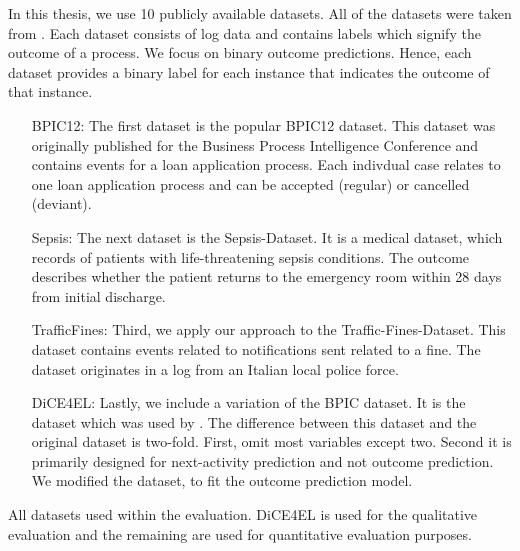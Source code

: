 \documentclass[./../../paper.tex]{subfiles}
\begin{document}
In this thesis, we use 10 publicly available datasets. All of the datasets were taken from \citeauthor{teinemaa_OutcomeOrientedPredictiveProcess_2018a}. Each dataset consists of log data and contains labels which signify the outcome of a process. We focus on binary outcome predictions. Hence, each dataset provides a binary label for each \gls{instance} that indicates the outcome of that \gls{instance}. 

\begin{enumerate}
    \item[BPIC12:] The first dataset is the popular BPIC12 dataset. This dataset was originally published for the Business Process Intelligence Conference and contains events for a loan application process. Each indivdual case relates to one loan application process and can be accepted (regular) or cancelled (deviant).
    \item[Sepsis:] The next dataset is the Sepsis-Dataset. It is a medical dataset, which records of patients with life-threatening sepsis conditions. The outcome describes whether the patient returns to the emergency room within 28 days from initial discharge.
    \item[TrafficFines:] Third, we apply our approach to the Traffic-Fines-Dataset. This dataset contains events related to notifications sent related to a fine. The dataset originates in a log from an Italian local police force.
    \item[DiCE4EL:] Lastly, we include a variation of the BPIC dataset. It is the dataset which was used by \citeauthor{hsieh_DiCE4ELInterpretingProcess_2021}. The difference between this dataset and the original dataset is two-fold. First, \citeauthor{hsieh_DiCE4ELInterpretingProcess_2021} omit most variables except two. Second it is primarily designed for next-activity prediction and not outcome prediction. We modified the dataset, to fit the outcome prediction model.
\end{enumerate}

\begin{table}[htbp]
        \makebox[\linewidth]{
            
            }
            \caption{All datasets used within the evaluation. DiCE4EL is used for the qualitative evaluation and the remaining are used for quantitative evaluation purposes.}
            \label{tbl:dataset-stats}
\end{table}
\end{document}
